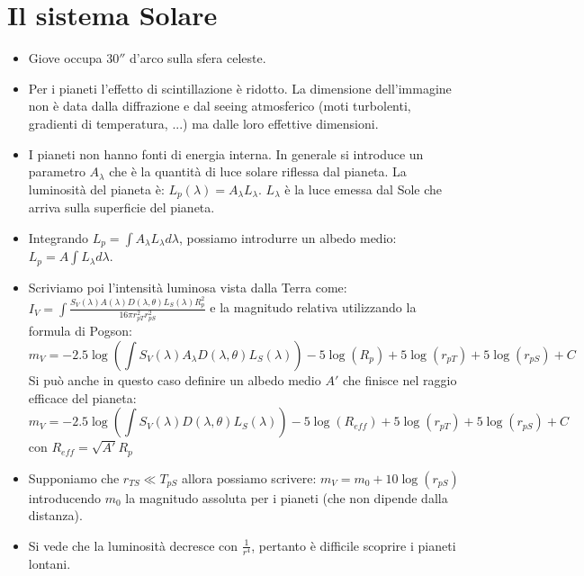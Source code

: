 \documentclass[11pt,a4paper]{article}
\begin{document}
\section{Il sistema Solare}
\begin{itemize}
\item Giove occupa $30''$ d'arco sulla sfera celeste.

\item Per i pianeti l'effetto di scintillazione è ridotto. La dimensione dell'immagine non è data dalla diffrazione e dal seeing atmosferico (moti turbolenti, gradienti di temperatura, ...) ma dalle loro effettive dimensioni.

\item I pianeti non hanno fonti di energia interna. In generale si introduce un parametro $A_{\lambda}$ che è la quantità di luce solare riflessa dal pianeta. La luminosità del pianeta è: $L_{p} (\lambda) = A_{\lambda} L_{\lambda}$. $L_{\lambda}$ è la luce emessa dal Sole che arriva sulla superficie del pianeta.

\item Integrando $L_p = \int A_{\lambda}  L_{\lambda} d \lambda $, possiamo introdurre un albedo medio: $L_p = A \int L_{\lambda} d \lambda$.

\item Scriviamo poi l'intensità luminosa vista dalla Terra come: $I_V = \int \frac{S_{V}(\lambda) A(\lambda) D(\lambda, \theta) L_{S}(\lambda) R_p^{2}}{16 \pi r_{pT}^{2} r_{pS}^{2}}$ e la magnitudo relativa utilizzando la formula di Pogson:
\begin{equation}
m_V = -2.5 \log \left( \int S_V (\lambda) A_{\lambda} D(\lambda, \theta) L_{S} (\lambda) \right) - 5 \log(R_p) + 5 \log(r_{pT}) + 5 \log(r_{pS}) + C
\end{equation}
Si può anche in questo caso definire un albedo medio $A'$ che finisce nel raggio efficace del pianeta:
\begin{equation}
m_V = -2.5 \log \left( \int S_V (\lambda) D(\lambda, \theta) L_{S} (\lambda) \right) - 5 \log(R_{eff}) + 5 \log(r_{pT}) + 5 \log(r_{pS}) + C
\end{equation}
con $R_{eff} = \sqrt{A'} R_p$

\item Supponiamo che $r_{TS} \ll T_{pS}$ allora possiamo scrivere: $m_V = m_0 + 10 \log(r_{pS})$ introducendo $m_0$ la magnitudo assoluta per i pianeti (che non dipende dalla distanza).

\item Si vede che la luminosità decresce con $\frac{1}{r^4}$, pertanto è difficile scoprire i pianeti lontani.


\end{itemize}
\end{document}

